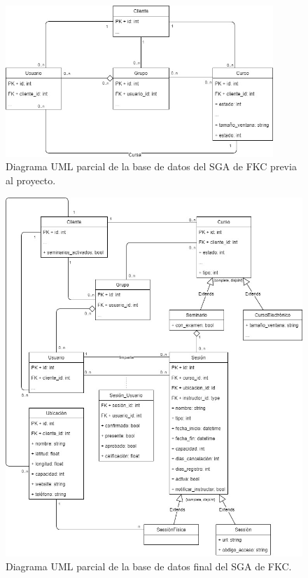 \begin{figure}[t]
	\begin{center}
		\includegraphics[width=0.9\textwidth]{figuras/databasePrevia.jpg}
		\caption{Diagrama UML parcial de la base de datos del SGA de FKC previa al proyecto.} \label{fig:baseDeDatosPrevia}
	\end{center}
\end{figure}

\begin{figure}[t]
	\begin{center}
		\includegraphics[width=\textwidth]{figuras/database.jpg}
		\caption{Diagrama UML parcial de la base de datos final del SGA de FKC.} \label{fig:baseDeDatosFinal}
	\end{center}
\end{figure}

